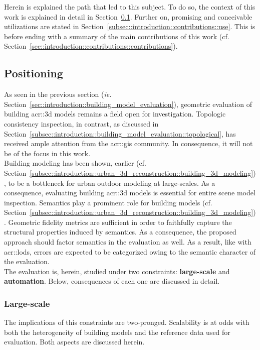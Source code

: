     Herein is explained the path that led to this subject.
    To do so, the context of this work is explained in detail in Section~\ref{subsec::introduction::contributions::positioning}.
    Further on, promising and conceivable utilizations are stated in Section~\ref{subsec::introduction::contributions::use}.
    This is before ending with a summary of the main contributions of this work (cf. Section~\ref{sec::introduction::contributions::contributions}).
    
    \subsection{Positioning}
        \label{subsec::introduction::contributions::positioning}
        As seen in the previous section (\textit{ie.} Section~\ref{sec::introduction::building_model_evaluation}), geometric evaluation of building \gls{acr::3d} models remains a field open for investigation.
        Topologic consistency inspection, in contrast, as discussed in Section~\ref{subsec::introduction::building_model_evaluation::topological}, has received ample attention from the \gls{acr::gis} community.
        In consequence, it will not be of the focus in this work.\\

        Building modeling has been shown, earlier (cf. Section~\ref{subsec::introduction::urban_3d_reconstruction::building_3d_modeling}), to be a bottleneck for urban outdoor modeling at large-scales.
        As a consequence, evaluating building \gls{acr::3d} models is essential for entire scene model inspection.
        Semantics play a prominent role for building models (cf. Section~\ref{subsec::introduction::urban_3d_reconstruction::building_3d_modeling}).
        Geometric fidelity metrics are sufficient in order to faithfully capture the structural properties induced by semantics.
        As a consequence, the proposed approach should factor semantics in the evaluation as well.
        As a result, like with \glspl{acr::lod}, errors are expected to be categorized owing to the semantic character of the evaluation.\\

        The evaluation is, herein, studied under two constraints: \textbf{large-scale} and \textbf{automation}.
        Below, consequences of each one are discussed in detail.
        \subsubsection{Large-scale}
            The implications of this constraints are two-pronged.
            Scalability is at odds with both the heterogeneity of building models and the reference data used for evaluation.
            Both aspects are discussed herein.\\

